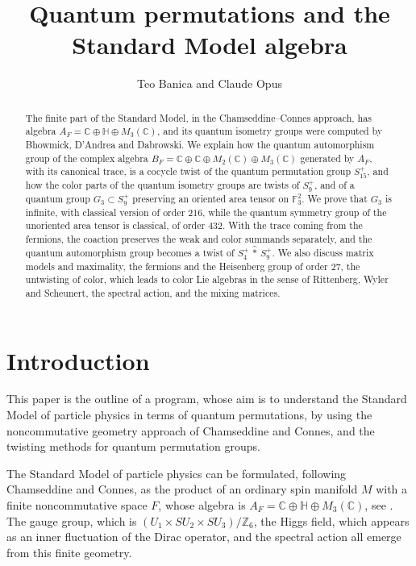 \documentclass[11pt]{amsart}
\theoremstyle{definition}
\begin{document}
\title[Standard Model algebra]{Quantum permutations and the Standard Model algebra}

\author{Teo Banica and Claude Opus}

\begin{abstract}
The finite part of the Standard Model, in the Chamseddine--Connes approach, has algebra $A_F=\mathbb C\oplus\mathbb H\oplus M_3(\mathbb C)$, and its quantum isometry groups were computed by Bhowmick, D'Andrea and Dabrowski. We explain how the quantum automorphism group of the complex algebra $B_F=\mathbb C\oplus\mathbb C\oplus M_2(\mathbb C)\oplus M_3(\mathbb C)$ generated by $A_F$, with its canonical trace, is a cocycle twist of the quantum permutation group $S_{15}^+$, and how the color parts of the quantum isometry groups are twists of $S_9^+$, and of a quantum group $G_3\subset S_9^+$ preserving an oriented area tensor on $\mathbb F_3^2$. We prove that $G_3$ is infinite, with classical version of order $216$, while the quantum symmetry group of the unoriented area tensor is classical, of order $432$. With the trace coming from the fermions, the coaction preserves the weak and color summands separately, and the quantum automorphism group becomes a twist of $S_4^+\,\hat{*}\,S_9^+$. We also discuss matrix models and maximality, the fermions and the Heisenberg group of order $27$, the untwisting of color, which leads to color Lie algebras in the sense of Rittenberg, Wyler and Scheunert, the spectral action, and the mixing matrices.
\end{abstract}

\maketitle

\tableofcontents

\section*{Introduction}

This paper is the outline of a program, whose aim is to understand the Standard Model of particle physics in terms of quantum permutations, by using the noncommutative geometry approach of Chamseddine and Connes, and the twisting methods for quantum permutation groups.

The Standard Model of particle physics can be formulated, following Chamseddine and Connes, as the product of an ordinary spin manifold $M$ with a finite noncommutative space $F$, whose algebra is $A_F=\mathbb C\oplus\mathbb H\oplus M_3(\mathbb C)$, see \cite{cc1,cc2,ccm,con,cm}. The gauge group, which is $(U_1\times SU_2\times SU_3)/\mathbb Z_6$, the Higgs field, which appears as an inner fluctuation of the Dirac operator, and the spectral action all emerge from this finite geometry.
\end{document}
